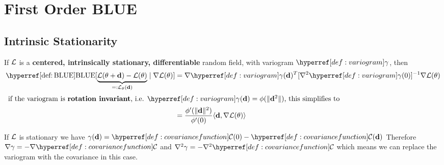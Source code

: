 \section{First Order BLUE}

\subsection{Intrinsic Stationarity}

\begin{lemma}\label{lem: blue centered, intrinsically stationary}
	If \(\mathcal{L}\) is a \textbf{centered, intrinsically stationary, differentiable}
	random field, with variogram \(\variogram\), then
	\begin{align*}
		\BLUE[\underbrace{\Loss(\param+\step) - \Loss(\param)}_{=:\Loss_\param(\step)}
		\mid \grad\Loss(\param)]
		&=  \grad\variogram(\step)^T[\grad^2\variogram(0)]^{-1}
		\grad\Loss(\param)\\
		\intertext{
			if the variogram is \textbf{rotation invariant}, i.e.
			\(\variogram(\step)=\phi(\|\step^2\|)\), this simplifies to
		}
		&= \frac{\phi'(\|\step\|^2)}{\phi'(0)}
		\langle \step, \grad\Loss(\param)\rangle
	\end{align*}
\end{lemma}
\begin{remark}\label{rem: replace variogram with covariance}
	If \(\mathcal{L}\) is stationary we have \(\gamma(\step) = \C(0) - \C(\step)\)
	Therefore \(\grad\gamma = - \grad\C\) and \(\grad^2\gamma = -\grad^2\C\)
	which means we can replace the variogram with the covariance in this case.
\end{remark}


